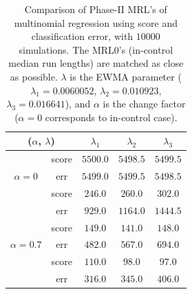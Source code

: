 \documentclass[twoside,11pt]{article}
\begin{document}
\begin{table}[!t]
\centering
\begin{tabular}{ccccc}
\toprule
\multicolumn{2}{c}{($ \alpha$, $ \lambda$)} & $ \lambda_1$ & $ \lambda_2$ & $ \lambda_3$ \\
\midrule
\multirow{3}{*}{$\alpha=0$} & score &$5500.0$ & $5498.5$ & $5499.5$ \\
& err &$5499.0$ & $5499.5$ & $5498.5$ \\
\midrule
\multirow{3}{*}{$\alpha=0.5$} & score &$\bm{246.0}$ & $\bm{260.0}$ & $\bm{302.0}$ \\
& err &$929.0$ & $1164.0$ & $1444.5$ \\
\midrule
\multirow{3}{*}{$\alpha=0.7$} & score &$\bm{149.0}$ & $\bm{141.0}$ & $\bm{148.0}$ \\
& err &$482.0$ & $567.0$ & $694.0$ \\
\midrule
\multirow{3}{*}{$\alpha=0.9$} & score &$\bm{110.0}$ & $\bm{98.0}$ & $\bm{97.0}$ \\
& err &$316.0$ & $345.0$ & $406.0$ \\
\midrule
\end{tabular}
\caption{Comparison of Phase-II MRL's of multinomial regression using score and classification error, with $10000$ simulations. The MRL0's (in-control median run lengths) are matched as close as possible. $ \lambda$ is the EWMA parameter ({$ \lambda_1 = 0.0060052$}, {$ \lambda_2 = 0.010923$}, {$ \lambda_3 = 0.016641$}), and $ \alpha$ is the change factor ($ \alpha=0$ corresponds to in-control case).}
\label{tab:multi_logi_MRL}
\end{table}
\end{document}
